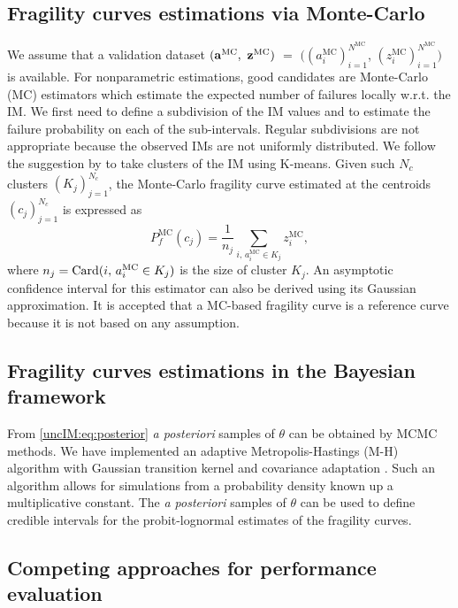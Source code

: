     \subsection{Fragility curves estimations via Monte-Carlo}
     \label{uncIM:sec:reference}
        We assume that a validation dataset $(\mathbf{a}^{\mathrm{MC}},$ $\mathbf{z}^{\mathrm{MC}})$ $ =$ $ ( (a_i^{\mathrm{MC}})_{i=1}^{N^{\mathrm{MC}}} $, $(z_i^{\mathrm{MC}})_{i=1}^{N^{\mathrm{MC}}})$ is available. For nonparametric estimations, good candidates are Monte-Carlo (MC) estimators which estimate the expected number of failures locally w.r.t. the IM. We first need to define a subdivision of the IM values and to estimate the failure probability on each of the sub-intervals. Regular subdivisions are not appropriate because the observed IMs are not uniformly distributed. We follow the suggestion by \citet{trevlopoulos_parametric_2019} to take clusters of the IM using K-means. 
        Given such $N_c$ clusters $(K_j)_{j=1}^{N_c}$, the Monte-Carlo fragility curve estimated at the centroids $(c_j)_{j=1}^{N_c}$ is expressed as
            \begin{equation} \label{uncIM:eq:refMC}
                P_f^{\mathrm{MC}}(c_j) = \frac{1}{n_j}\sum_{i,\,a_i^{\mathrm{MC}}\in K_j}z_i^{\mathrm{MC}}  , 
            \end{equation}
        where $n_j = {\rm Card}(i,\,a_i^{\mathrm{MC}}\in K_j)$ is the size of cluster $K_j$.
        An asymptotic confidence interval for this estimator can also be derived using its Gaussian approximation. It is accepted that a MC-based fragility curve is a reference curve because it is not based on any assumption.

    \subsection{Fragility curves estimations in the Bayesian framework}  \label{uncIM:sec:BayesFram}
        From \cref{uncIM:eq:posterior} \emph{a posteriori} samples of $\theta$ can be obtained by MCMC methods. We have implemented an adaptive Metropolis-Hastings (M-H) algorithm with Gaussian transition kernel and covariance adaptation \citep{haario_adaptive_2001}. Such an algorithm allows for simulations from a probability density known up a multiplicative constant. The \emph{a posteriori} samples of $\theta$ can be used to define credible intervals for the probit-lognormal estimates of the fragility curves.

    \subsection{Competing approaches for performance evaluation} \label{uncIM:sec:Competing}
    
